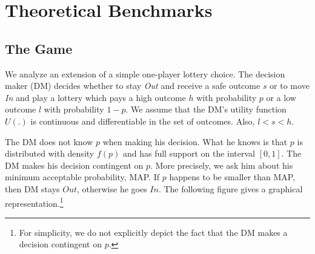 %
%
%



\clearpage
\pagebreak



\clearpage
\pagebreak

\appendix
\section{Theoretical Benchmarks}
\label{section:appendixa}
\setcounter{figure}{0}
\setcounter{table}{0}
\renewcommand{\thefigure}{A.\arabic{figure}}
\renewcommand{\thetable}{A.\arabic{table}}
\subsection{The Game}

We analyze an extension of a simple one-player lottery choice.
The decision maker (DM) decides whether to stay \emph{Out} and receive a safe outcome $s$ or to move \emph{In} and play a lottery which pays a high outcome $h$ with probability $p$ or a low outcome $l$ with probability $1-p$.
We assume that the DM's utility function $U(.)$ is continuous and differentiable in the set of outcomes.
Also, $l < s < h$. 

The DM does not know $p$ when making his decision.
What he knows is that $p$ is distributed with density $f(p)$ and has full support on the interval $[0,1]$.
The DM makes his decision contingent on $p$.
More precisely, we ask him about his minimum acceptable probability, MAP.
If $p$ happens to be smaller than MAP, then DM stays $Out$, otherwise he goes $In$.
The following figure gives a graphical representation.\footnote{
For simplicity, we do not explicitly depict the fact that the DM makes a decision contingent on $p$.
} 

